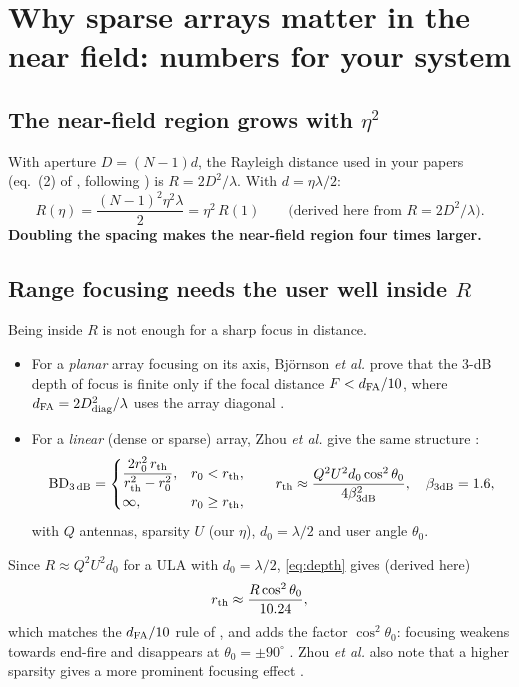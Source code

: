 \documentclass[11pt]{article}
\begin{document}
\section{Why sparse arrays matter in the near field: numbers for your system}
\label{sec:why}

\subsection{The near-field region grows with $\eta^2$}
With aperture $D=(N-1)d$, the Rayleigh distance used in your papers (eq.~(2) of \cite{haider2026vtc}, following \cite{lu2024tutorial}) is $R=2D^2/\lambda$. With $d=\eta\lambda/2$:
\begin{equation}
  R(\eta)=\frac{(N-1)^2\eta^2\lambda}{2}=\eta^2\,R(1)\qquad\text{(derived here from $R=2D^2/\lambda$).}
  \label{eq:rayleigh}
\end{equation}
\textbf{Doubling the spacing makes the near-field region four times larger.}

\subsection{Range focusing needs the user well inside $R$}
Being inside $R$ is not enough for a sharp focus in distance.
\begin{itemize}
  \item For a \emph{planar} array focusing on its axis, Bj\"ornson \emph{et al.} prove that the 3-dB depth of focus is finite only if the focal distance $F<d_{\rm FA}/10$, where $d_{\rm FA}=2D_{\rm diag}^2/\lambda$ uses the array diagonal \cite[eq.~(17), Theorem~1, eq.~(23)]{bjornson2021primer}.
  \item For a \emph{linear} (dense or sparse) array, Zhou \emph{et al.} give the same structure \cite[Proposition~2, eq.~(22)]{zhou2025sparse}:
  \begin{equation}
    \mathrm{BD}_{3\,\rm dB}=
    \begin{cases}
      \dfrac{2r_0^2\,r_{\rm th}}{r_{\rm th}^2-r_0^2}, & r_0<r_{\rm th},\\[6pt]
      \infty, & r_0\ge r_{\rm th},
    \end{cases}
    \qquad
    r_{\rm th}\approx\frac{Q^2U^2d_0\cos^2\theta_0}{4\beta_{3\rm dB}^2},\quad \beta_{3\rm dB}=1.6,
    \label{eq:depth}
  \end{equation}
  with $Q$ antennas, sparsity $U$ (our $\eta$), $d_0=\lambda/2$ and user angle $\theta_0$.
\end{itemize}
Since $R\approx Q^2U^2d_0$ for a ULA with $d_0=\lambda/2$, \eqref{eq:depth} gives (derived here)
\begin{equation}
  r_{\rm th}\approx\frac{R\cos^2\theta_0}{10.24},
  \label{eq:rth}
\end{equation}
which matches the $d_{\rm FA}/10$ rule of \cite{bjornson2021primer}, and adds the factor $\cos^2\theta_0$: focusing weakens towards end-fire and disappears at $\theta_0=\pm90^\circ$ \cite[Remark~1]{zhou2025sparse}. Zhou \emph{et al.} also note that a higher sparsity gives a more prominent focusing effect \cite[Remark~1]{zhou2025sparse}.
\end{document}
